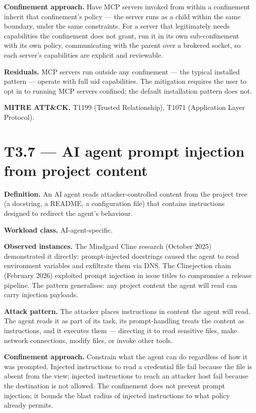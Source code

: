 \textbf{Confinement approach.} Have MCP servers invoked from within a
confinement inherit that confinement's policy --- the server runs as a
child within the same boundary, under the same constraints. For a server
that legitimately needs capabilities the confinement does not grant, run
it in its own sub-confinement with its own policy, communicating with
the parent over a brokered socket, so each server's capabilities are
explicit and reviewable.

\textbf{Residuals.} MCP servers run outside any confinement --- the
typical installed pattern --- operate with full uid capabilities. The
mitigation requires the user to opt in to running MCP servers confined;
the default installation pattern does not.

\textbf{MITRE ATT\&CK.} T1199 (Trusted Relationship), T1071 (Application
Layer Protocol).

\hypertarget{t3.7-ai-agent-prompt-injection-from-project-content}{%
\section{T3.7 --- AI agent prompt injection from project
content}\label{t3.7-ai-agent-prompt-injection-from-project-content}}

\textbf{Definition.} An AI agent reads attacker-controlled content from
the project tree (a docstring, a README, a configuration file) that
contains instructions designed to redirect the agent's behaviour.

\textbf{Workload class.} AI-agent-specific.

\textbf{Observed instances.} The Mindgard Cline research (October 2025)
demonstrated it directly: prompt-injected docstrings caused the agent to
read environment variables and exfiltrate them via DNS. The Clinejection
chain (February 2026) exploited prompt injection in issue titles to
compromise a release pipeline. The pattern generalises: any project
content the agent will read can carry injection payloads.

\textbf{Attack pattern.} The attacker places instructions in content the
agent will read. The agent reads it as part of its task, its
prompt-handling treats the content as instructions, and it executes them
--- directing it to read sensitive files, make network connections,
modify files, or invoke other tools.

\textbf{Confinement approach.} Constrain what the agent can do
regardless of how it was prompted. Injected instructions to read a
credential file fail because the file is absent from the view; injected
instructions to reach an attacker host fail because the destination is
not allowed. The confinement does not prevent prompt injection; it
bounds the blast radius of injected instructions to what policy already
permits.

